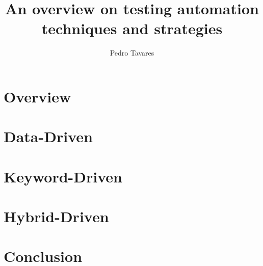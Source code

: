 \documentclass[a4paper]{article}
\title{An overview on testing automation techniques and strategies}
\author{Pedro Tavares}
\begin{document}
\maketitle



\tableofcontents

\section{Overview}

\section{Data-Driven}
\section{Keyword-Driven}
\section{Hybrid-Driven}
\section{Conclusion}



\end{document}
